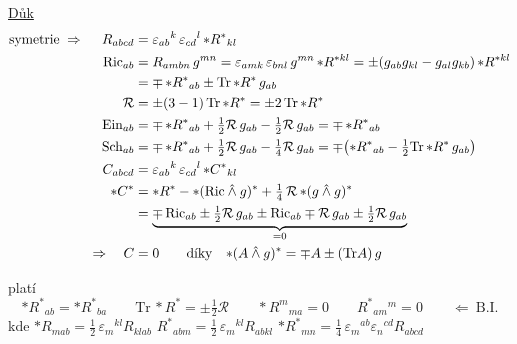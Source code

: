 \underline{Důk}
\begin{align*}
  \text{symetrie} \;\Rightarrow\;\quad R_{abcd} &= \varepsilon_{ab}{}^{k}\,\varepsilon_{cd}{}^{l}\,{*}R^{*}{}_{kl} \\
  \mathrm{Ric}_{ab} &= R_{ambn}\,g^{mn} = \varepsilon_{amk}\,\varepsilon_{bnl}\,g^{mn}\,{*}R^{*kl} = \pm(g_{ab}g_{kl} - g_{al}g_{kb})\,{*}R^{*kl} \\
  &= \mp\,{*}R^{*}{}_{ab} \pm \mathrm{Tr}\,{*}R^{*}\,g_{ab} \\
  \mathcal{R} &= \pm(3-1)\,\mathrm{Tr}\,{*}R^{*} = \pm 2\,\mathrm{Tr}\,{*}R^{*} \\
  \mathrm{Ein}_{ab} &= \mp\,{*}R^{*}{}_{ab} + \tfrac12\mathcal{R}\,g_{ab} - \tfrac12\mathcal{R}\,g_{ab} = \mp\,{*}R^{*}{}_{ab} \\
  \mathrm{Sch}_{ab} &= \mp\,{*}R^{*}{}_{ab} + \tfrac12\mathcal{R}\,g_{ab} - \tfrac14\mathcal{R}\,g_{ab} = \mp\big({*}R^{*}{}_{ab} - \tfrac12\mathrm{Tr}\,{*}R^{*}\,g_{ab}\big) \\
  C_{abcd} &= \varepsilon_{ab}{}^{k}\,\varepsilon_{cd}{}^{l}\,{*}C^{*}{}_{kl} \\
  {*}C^{*} &= {*}R^{*} - {*}(\mathrm{Ric}\owedge g)^{*} + \tfrac14\,\mathcal{R}\,{*}(g\owedge g)^{*} \\
  &= \underbrace{\mp\,\mathrm{Ric}_{ab} \pm \tfrac12\mathcal{R}\,g_{ab} \pm \mathrm{Ric}_{ab} \mp \mathcal{R}\,g_{ab} \pm \tfrac12\mathcal{R}\,g_{ab}}_{=0} \\
  \Rightarrow\quad C &= 0
  \qquad\text{díky}\quad {*}(A\owedge g)^{*} = \mp A \pm (\mathrm{Tr}A)\,g
\end{align*}

platí
\[
  {*}R^{*}{}_{ab} = {*}R^{*}{}_{ba} \qquad \mathrm{Tr}\,{*}R^{*} = \pm\tfrac12\mathcal{R} \qquad {*}R^{m}{}_{ma} = 0 \qquad R^{*}{}_{am}{}^{m} = 0 \qquad \Leftarrow\ \text{B.I.}
\]
kde \quad ${*}R_{mab} = \tfrac12\,\varepsilon_m{}^{kl}R_{klab}$ \qquad $R^{*}{}_{abm} = \tfrac12\,\varepsilon_m{}^{kl}R_{abkl}$ \qquad ${*}R^{*}{}_{mn} = \tfrac14\,\varepsilon_m{}^{ab}\varepsilon_n{}^{cd}R_{abcd}$

